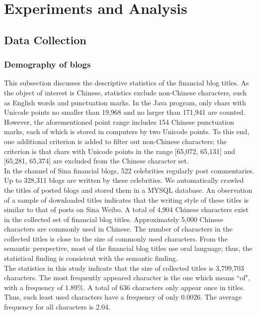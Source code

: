 \documentclass[review,3p,times,12pt,number]{elsarticle}
\begin{document}
\section{Experiments and Analysis}
\label{sec:weibo:ea}

\subsection{Data Collection}
\subsubsection{Demography of blogs}
This subsection discusses the descriptive statistics of the financial blog titles. As the object of interest is Chinese, statistics exclude non-Chinese characters, such as English words and punctuation marks. In the Java program, only chars with Unicode points no smaller than 19,968 and no larger than 171,941 are counted. However, the aforementioned point range includes 154 Chinese punctuation marks, each of which is stored in computers by two Unicode points. To this end, one additional criterion is added to filter out non-Chinese characters; the criterion is that chars with Unicode points in the range [65,072, 65,131] and [65,281, 65,374] are excluded from the Chinese character set.\\
\indent
In the channel of Sina financial blogs, 522 celebrities regularly post commentaries. Up to 328,311 blogs are written by these celebrities. We automatically crawled the titles of posted blogs and stored them in a MYSQL database. An observation of a sample of downloaded titles indicates that the writing style of these titles is similar to that of posts on Sina Weibo. A total of 4,904 Chinese characters exist in the collected set of financial blog titles. Approximately 5,000 Chinese characters are commonly used in Chinese. The number of characters in the collected titles is close to the size of commonly used characters. From the semantic perspective, most of the financial blog titles use oral language; thus, the statistical finding is consistent with the semantic finding.\\
\indent
The statistics in this study indicate that the size of collected titles is 3,799,703 characters. The most frequently appeared character is the one which means ``of", with a frequency of 1.89\%. A total of 636 characters only appear once in titles. Thus, such least used characters have a frequency of only 0.0026\textpertenthousand. The average frequency for all characters is 2.04\textpertenthousand.
\end{document}
